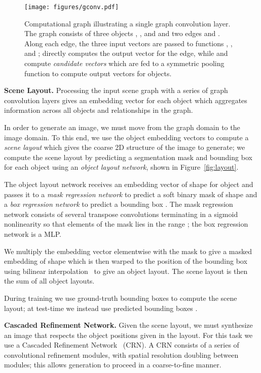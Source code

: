 \documentclass[10pt,twocolumn,letterpaper]{article}
\begin{document}
\begin{figure}[t]
  \centering
  \texttt{[image: figures/gconv.pdf]}
  \caption{
    Computational graph illustrating a single graph convolution layer.
    The graph consists of three objects , , and  and two
    edges  and . Along each edge, the three
    input vectors are passed to functions , , and ;  directly
    computes the output vector for the edge, while  and  compute
    \emph{candidate vectors} which are fed to a symmetric pooling function 
    to compute output vectors for objects.
  }
  \vspace{-2mm}
  \label{fig:gconv}
\end{figure}

\textbf{Scene Layout.}
Processing the input scene graph with a series of graph convolution layers
gives an embedding vector for each object which aggregates information across
all objects and relationships in the graph.

In order to generate an image, we must move from the graph domain to the image
domain. To this end, we use the object embedding vectors to compute a
\emph{scene layout} which gives the coarse 2D structure of the image to
generate; we compute the scene layout by predicting a segmentation mask and
bounding box for each object using an \emph{object layout network}, shown in
Figure~\ref{fig:layout}.


The object layout network receives an embedding vector  of shape  for
object  and passes
it to a \emph{mask regression network} to predict a soft binary mask  
of shape  and a \emph{box regression network} to predict a bounding box
. The mask regression network consists of several
transpose convolutions terminating in a sigmoid nonlinearity so that
elements of the mask lies in the range ; the box regression network
is a MLP. 

We multiply the embedding vector  elementwise with the mask 
to give a masked embedding of shape  which is then warped
to the position of the bounding box using bilinear
interpolation~\cite{jaderberg2015spatial} to give an object layout.
The scene layout is then the sum of all object layouts.

During training we use ground-truth bounding boxes  to compute the scene
layout; at test-time we instead use predicted bounding boxes .

\textbf{Cascaded Refinement Network.}
Given the scene layout, we must synthesize an image that respects the object
positions given in the layout. For this task we use a Cascaded Refinement
Network~\cite{chen2017photographic} (CRN). A CRN consists of a series of
convolutional refinement modules, with spatial resolution doubling between
modules; this allows generation to proceed in a coarse-to-fine manner.
\end{document}
